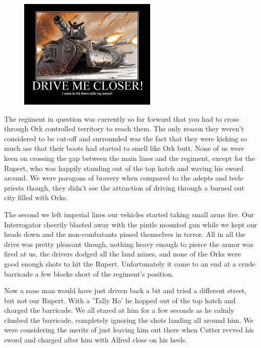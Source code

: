 \begin{figure}
	\begin{center}
		\includegraphics[width=\figwidth]{pics/4/15.png}
	\end{center}
\end{figure}
The regiment in question was currently so far forward that you had to cross through Ork controlled territory to reach them. 
The only reason they weren't considered to be cut-off and surrounded was the fact that they were kicking so much ass that their boots had started to smell like Ork butt. 
None of us were keen on crossing the gap between the main lines and the regiment, except for the Rupert, who was happily standing out of the top hatch and waving his sword around. 
We were paragons of bravery when compared to the adepts and tech-priests though, they didn’t see the attraction of driving through a burned out city filled with Orks.

The second we left imperial lines our vehicles started taking small arms fire. 
Our Interrogator cheerily blasted away with the pintle mounted gun while we kept our heads down and the non-combatants pissed themselves in terror. 
All in all the drive was pretty pleasant though, nothing heavy enough to pierce the armor was fired at us, the drivers dodged all the land mines, and none of the Orks were good enough shots to hit the Rupert. 
Unfortunately it came to an end at a crude barricade a few blocks short of the regiment's position.

Now a sane man would have just driven back a bit and tried a different street, but not our Rupert. 
With a 'Tally Ho' he hopped out of the top hatch and charged the barricade. 
We all stared at him for a few seconds as he calmly climbed the barricade, completely ignoring the shots landing all around him. 
We were considering the merits of just leaving him out there when Cutter revved his sword and charged after him with Alfred close on his heels.

